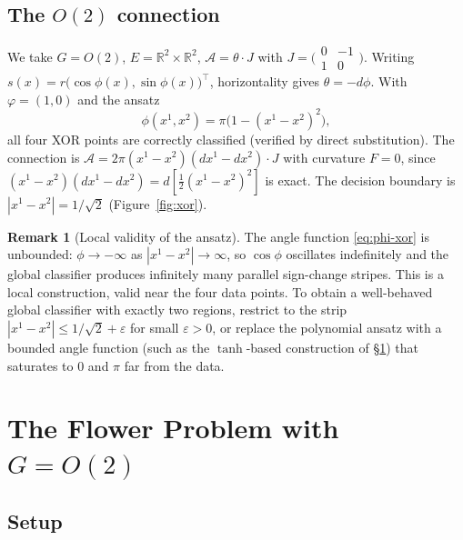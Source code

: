 \documentclass[11pt, a4paper]{article}
\theoremstyle{plain}
\theoremstyle{definition}
\newtheorem{remark}[theorem]{Remark}
\newcommand{\R}{\mathbb{R}}
\newcommand{\Sig}{\mathcal{A}}
\begin{document}
\subsection{The $O(2)$ connection}

We take $G = O(2)$, $E = \R^2\times\R^2$, $\Sig = \theta\cdot J$ with
$J = \bigl(\begin{smallmatrix}0&{-1}\\1&0\end{smallmatrix}\bigr)$.
Writing $s(x) = r\bigl(\cos\phi(x),\sin\phi(x)\bigr)^\top$, horizontality gives
$\theta = -d\phi$. With $\varphi = (1,0)$ and the ansatz
\begin{equation}\label{eq:phi-xor}
  \phi(x^1,x^2) = \pi\bigl(1-(x^1-x^2)^2\bigr),
\end{equation}
all four XOR points are correctly classified (verified by direct substitution). The
connection is $\Sig = 2\pi(x^1-x^2)(dx^1-dx^2)\cdot J$ with curvature $F = 0$,
since $(x^1-x^2)(dx^1-dx^2) = d[\tfrac{1}{2}(x^1-x^2)^2]$ is exact. The decision
boundary is $|x^1-x^2| = 1/\sqrt{2}$ (Figure~\ref{fig:xor}).

\begin{remark}[Local validity of the ansatz]
The angle function \eqref{eq:phi-xor} is unbounded: $\phi \to -\infty$ as
$|x^1-x^2| \to \infty$, so $\cos\phi$ oscillates indefinitely and the global
classifier produces infinitely many parallel sign-change stripes. This is a local
construction, valid near the four data points. To obtain a well-behaved global
classifier with exactly two regions, restrict to the strip
$|x^1-x^2| \leq 1/\sqrt{2} + \varepsilon$ for small $\varepsilon > 0$, or
replace the polynomial ansatz with a bounded angle function (such as the
$\tanh$-based construction of \S\ref{sec:flower}) that saturates to $0$ and $\pi$
far from the data.
\end{remark}

\section{The Flower Problem with $G = O(2)$}\label{sec:flower}

\subsection{Setup}
\end{document}
